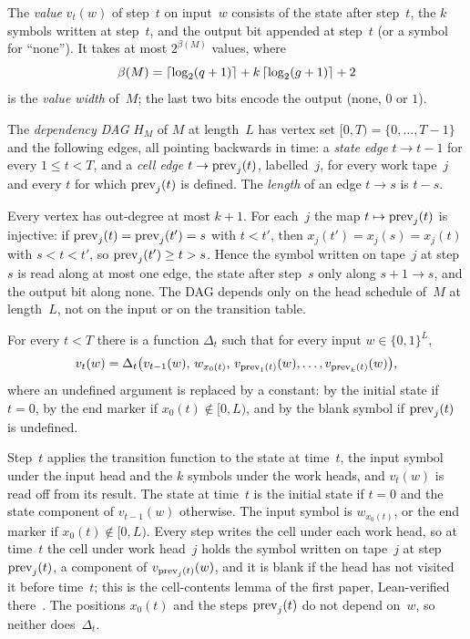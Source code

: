 The \emph{value} $v_t(w)$ of step~$t$ on input~$w$ consists of the state after step~$t$, the $k$ symbols written at
step~$t$, and the output bit appended at step~$t$ (or a symbol for ``none''). It takes at most $2^{\beta(M)}$ values,
where
\[
  \beta(M)=\lceil \log_2 (q+1) \rceil+k\,\lceil \log_2 (g+1) \rceil+2
\]
is the \emph{value width} of~$M$; the last two bits encode the output (none, $0$ or $1$).

\begin{definition}\label{def:depgraph}
The \emph{dependency DAG} $H_M$ of $M$ at length~$L$ has vertex set $[0,T)=\{0,\dots,T-1\}$ and the following edges,
all pointing backwards in time: a \emph{state edge} $t\to t-1$ for every $1\le t<T$, and a \emph{cell edge}
$t\to\mathrm{prev}_j(t)$, labelled~$j$, for every work tape~$j$ and every $t$ for which $\mathrm{prev}_j(t)$ is defined. The
\emph{length} of an edge $t\to s$ is $t-s$.
\end{definition}

Every vertex has out-degree at most $k+1$. For each~$j$ the map $t\mapsto\mathrm{prev}_j(t)$ is injective: if
$\mathrm{prev}_j(t)=\mathrm{prev}_j(t')=s$ with $t<t'$, then $x_j(t')=x_j(s)=x_j(t)$ with $s<t<t'$, so $\mathrm{prev}_j(t')\ge t>s$. Hence
the symbol written on tape~$j$ at step~$s$ is read along at most one edge, the state after step~$s$ only along
$s+1\to s$, and the output bit along none. The DAG depends only on the head schedule of~$M$ at length~$L$, not on the
input or on the transition table.

\begin{lemma}\label{lem:dec-local}
\notformalized
For every $t<T$ there is a function $\Delta_t$ such that for every input $w\in\{0,1\}^L$,
\[
  v_t(w)=\Delta_t\bigl(v_{t-1}(w),\,w_{x_0(t)},\,v_{\mathrm{prev}_1(t)}(w),\dots,v_{\mathrm{prev}_k(t)}(w)\bigr),
\]
where an undefined argument is replaced by a constant: by the initial state if $t=0$, by the end marker if
$x_0(t)\notin[0,L)$, and by the blank symbol if $\mathrm{prev}_j(t)$ is undefined.
\end{lemma}

\begin{informalproof}
Step~$t$ applies the transition function to the state at time~$t$, the input symbol under the input head and the
$k$ symbols under the work heads, and $v_t(w)$ is read off from its result. The state at time~$t$ is the initial
state if $t=0$ and the state component of $v_{t-1}(w)$ otherwise. The input symbol is $w_{x_0(t)}$, or the end marker
if $x_0(t)\notin[0,L)$. Every step writes the cell under each work head, so at time~$t$ the cell under work head~$j$
holds the symbol written on tape~$j$ at step $\mathrm{prev}_j(t)$, a component of $v_{\mathrm{prev}_j(t)}(w)$, and it is blank if
the head has not visited it before time~$t$; this is the cell-contents lemma of the first paper, Lean-verified
there~\cite[Lemma~2.3]{FirstPaper2026}. The positions $x_0(t)$ and the steps $\mathrm{prev}_j(t)$ do not depend on~$w$, so neither
does~$\Delta_t$.
\end{informalproof}

